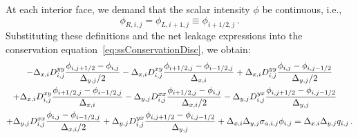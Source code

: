 At each interior face, we demand that the scalar intensity $\phi$ be continuous,
i.e.,
\begin{equation*}
  \phi_{R,i,j} = \phi_{L,i+1,j} \equiv \phi_{i+1/2,j}\,.
\end{equation*}
Substituting these definitions and the net leakage expressions into the
conservation equation~\eqref{eq:ssConservationDisc}, we obtain:
\begin{multline*}
- \Delta_{x,i} D_{i,j}^{yy}\frac{\phi_{i,j+1/2} - \phi_{i,j}}{\Delta_{y,j} / 2}
- \Delta_{x,i} D_{i,j}^{xy}\frac{\phi_{i+1/2,j} - \phi_{i-1/2,j}}{\Delta_{x,i} }
+ \Delta_{x,i} D_{i,j}^{yy}\frac{\phi_{i,j} - \phi_{i,j-1/2}}{\Delta_{y,j} / 2}
\\
\shoveleft{%
+ \Delta_{x,i} D_{i,j}^{xy}\frac{\phi_{i+1/2,j} - \phi_{i-1/2,j}}{\Delta_{x,i} }
- \Delta_{y,j} D_{i,j}^{xx}\frac{\phi_{i+1/2,j} - \phi_{i,j}}{\Delta_{x,i} / 2}
- \Delta_{y,j} D_{i,j}^{yx}\frac{\phi_{i,j+1/2} - \phi_{i,j-1/2}}{\Delta_{y,j} }
}
\\
+ \Delta_{y,j} D_{i,j}^{xx}\frac{\phi_{i,j} - \phi_{i-1/2,j}}{\Delta_{x,i} / 2}
+ \Delta_{y,j} D_{i,j}^{yx}\frac{\phi_{i,j+1/2} - \phi_{i,j-1/2}}{\Delta_{y,j} }
+ \Delta_{x,i}\Delta_{y,j} \sigma_{a,i,j} \phi_{i,j}
= \Delta_{x,i}\Delta_{y,j} q_{i,j}\,.
\end{multline*}
